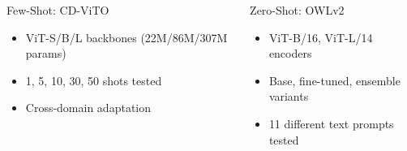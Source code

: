 \documentclass[aspectratio=43]{beamer}
\begin{document}
\begin{frame}
    \begin{columns}
        \begin{column}{0.5\textwidth}
            \begin{block}{Few-Shot: CD-ViTO}
                \small
                \begin{itemize}
                    \item ViT-S/B/L backbones (22M/86M/307M params)
                    \item 1, 5, 10, 30, 50 shots tested
                    \item Cross-domain adaptation
                \end{itemize}
            \end{block}
        \end{column}
        
        \begin{column}{0.5\textwidth}
            \begin{block}{Zero-Shot: OWLv2}
                \small
                \begin{itemize}
                    \item ViT-B/16, ViT-L/14 encoders
                    \item Base, fine-tuned, ensemble variants
                    \item 11 different text prompts tested
                \end{itemize}
            \end{block}
        \end{column}
    \end{columns}
\end{frame}
\end{document}

